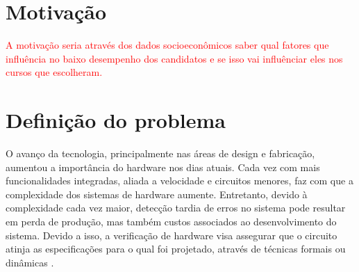 \section{Motivação}

\textcolor{red}{A motivação seria através dos dados socioeconômicos saber qual fatores que influência no baixo desempenho dos candidatos e se isso vai influênciar eles nos cursos que escolheram.}
% 

\section{Definição do problema}

O avanço da tecnologia, principalmente nas áreas de design e fabricação, aumentou a importância do hardware nos dias atuais. Cada vez com mais funcionalidades integradas, aliada a velocidade e circuitos menores, faz com que a complexidade dos sistemas de hardware aumente. Entretanto, devido à complexidade cada vez maior, detecção tardia de erros no sistema pode resultar em perda de produção, mas também custos associados ao desenvolvimento do sistema\cite{gupta1992formal}. Devido a isso, a verificação de hardware visa assegurar que o circuito atinja as especificações para o qual foi projetado, através de técnicas formais ou dinâmicas \cite{boule2007efficient}.


